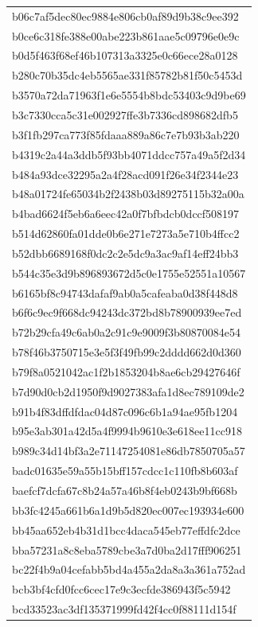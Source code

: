 \begin{tabular}{l}
b06c7af5dec80ec9884e806cb0af89d9b38c9ee392 \\
b0ce6c318fe388e00abe223b861aae5c09796e0e9c \\
b0d5f463f68ef46b107313a3325e0c66ece28a0128 \\
b280c70b35dc4eb5565ae331f85782b81f50c5453d \\
b3570a72da71963f1e6e5554b8bdc53403c9d9be69 \\
b3c7330cca5c31e002927ffe3b7336cd898682dfb5 \\
b3f1fb297ca773f85fdaaa889a86c7e7b93b3ab220 \\
b4319c2a44a3ddb5f93bb4071ddcc757a49a5f2d34 \\
b484a93dce32295a2a4f28acd091f26e34f2344e23 \\
b48a01724fe65034b2f2438b03d89275115b32a00a \\
b4bad6624f5eb6a6eec42a0f7bfbdcb0dccf508197 \\
b514d62860fa01dde0b6e271e7273a5e710b4ffcc2 \\
b52dbb6689168f0dc2c2e5dc9a3ac9af14eff24bb3 \\
b544c35e3d9b896893672d5c0e1755e52551a10567 \\
b6165bf8c94743dafaf9ab0a5cafeaba0d38f448d8 \\
b6f6c9ec9f668dc94243dc372bd8b78900939ee7ed \\
b72b29cfa49c6ab0a2c91c9e9009f3b80870084e54 \\
b78f46b3750715e3e5f3f49fb99c2dddd662d0d360 \\
b79f8a0521042ac1f2b1853204b8ae6cb29427646f \\
b7d90d0cb2d1950f9d9027383afa1d8ec789109de2 \\
b91b4f83dffdfdac04d87c096c6b1a94ae95fb1204 \\
b95e3ab301a42d5a4f9994b9610e3e618ee11cc918 \\
b989c34d14bf3a2e71147254081e86db7850705a57 \\
badc01635e59a55b15bff157cdcc1c110fb8b603af \\
baefcf7dcfa67c8b24a57a46b8f4eb0243b9bf668b \\
bb3fc4245a661b6a1d9b5d820ec007ec193934e600 \\
bb45aa652eb4b31d1bcc4daca545eb77effdfc2dce \\
bba57231a8c8eba5789cbe3a7d0ba2d17fff906251 \\
bc22f4b9a04cefabb5bd4a455a2da8a3a361a752ad \\
bcb3bf4cfd0fcc6cec17e9c3ecfde386943f5c5942 \\
bcd33523ac3df135371999fd42f4cc0f88111d154f \\

\end{tabular}
